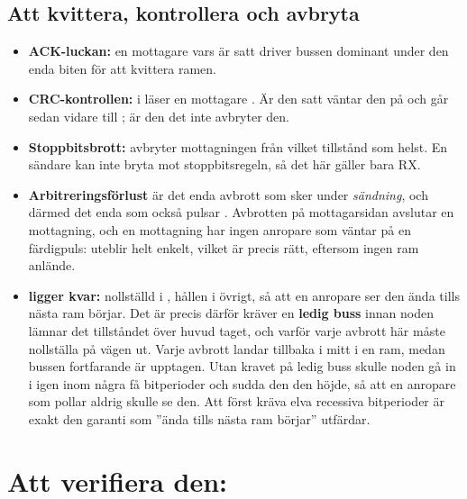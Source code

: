 \subsection*{Att kvittera, kontrollera och avbryta}
\begin{itemize}
  \item \textbf{ACK-luckan:} en mottagare vars  är satt driver bussen dominant under
    den enda biten för att kvittera ramen.
  \item \textbf{CRC-kontrollen:} i  läser en mottagare . Är
    den satt väntar den på  och går sedan vidare till ; är
    den det inte avbryter den.
  \item \textbf{Stoppbitsbrott:}  avbryter mottagningen från vilket
    tillstånd som helst. En sändare kan inte bryta mot stoppbitsregeln, så det här gäller bara RX.
  \item \textbf{Arbitreringsförlust} är det enda avbrott som sker under \emph{sändning}, och därmed
    det enda som också pulsar . Avbrotten på mottagarsidan avslutar en mottagning, och
    en mottagning har ingen anropare som väntar på en färdigpuls:  uteblir helt
    enkelt, vilket är precis rätt, eftersom ingen ram anlände.
  \item \textbf{ ligger kvar:} nollställd i , hållen i övrigt, så att
    en anropare ser den ända tills nästa ram börjar. Det är precis därför  kräver en
    \textbf{ledig buss} innan noden lämnar det tillståndet över huvud taget, och varför varje avbrott
    här måste nollställa  på vägen ut. Varje avbrott landar tillbaka i
     mitt i en ram, medan bussen fortfarande är upptagen. Utan kravet på ledig buss
    skulle noden gå in i  igen inom några få bitperioder och sudda den
     den höjde, så att en anropare som pollar  aldrig skulle se den. Att
    först kräva elva recessiva bitperioder är exakt den garanti som ”ända tills nästa ram börjar”
    utfärdar.
\end{itemize}

\section{Att verifiera den: }
\label{c17:sec:verify}

